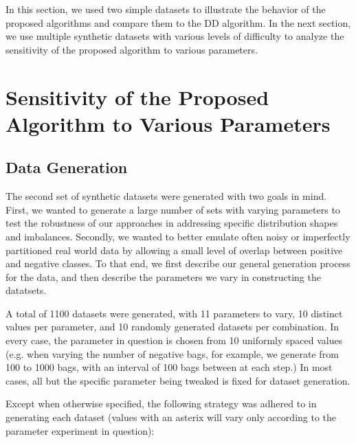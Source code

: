 \documentclass[12pt,dvips]{report}
\numberwithin{equation}{section}
\begin{document}
In this section, we used two simple datasets to illustrate the behavior of the proposed algorithms and compare them to the DD algorithm.  In the next section, we use multiple synthetic datasets with various levels of difficulty to analyze the sensitivity of the proposed algorithm to various parameters.

\section{Sensitivity of the Proposed Algorithm to Various Parameters} \label{sec:ParameterSynth}

\subsection{Data Generation} \label{subsec:ParameterSynthData}

The second set of synthetic datasets were generated with two goals in mind.  First, we wanted to generate a large number of sets with varying parameters to test the robustness of our approaches in addressing specific distribution shapes and imbalances.  Secondly, we wanted to better emulate often noisy or imperfectly partitioned real world data by allowing a small level of overlap between positive and negative classes.  To that end, we first describe our general generation process for the data, and then describe the parameters we vary in constructing the datatsets.  

A total of 1100 datasets were generated, with 11 parameters to vary, 10 distinct values per parameter, and 10 randomly generated datasets per combination.  In every case, the parameter in question is chosen from 10 uniformly spaced values (e.g. when varying the number of negative bags, for example, we generate from 100 to 1000 bags, with an interval of 100 bags between at each step.)  In most cases, all but the specific parameter being tweaked is fixed for dataset generation.

Except when otherwise specified, the following strategy was adhered to in generating each dataset (values with an asterix will vary only according to the parameter experiment in question):
\end{document}
